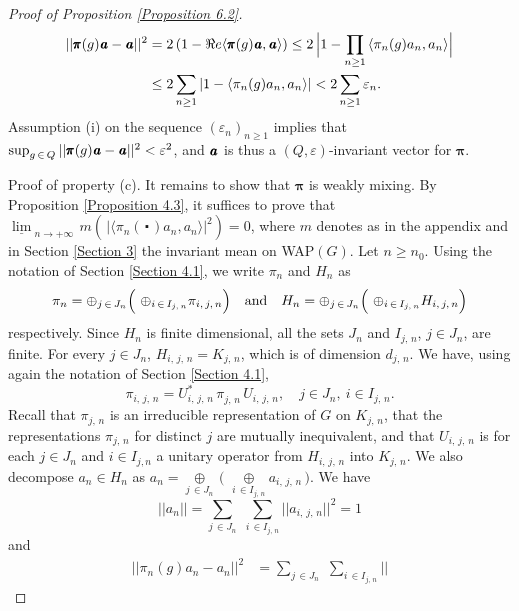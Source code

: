 \documentclass[11pt,english,a4paper]{smfart}
\numberwithin{equation}{section}
\theoremstyle{definition}
\begin{document}
\begin{proof}[Proof of Proposition \ref{Proposition 6.2}]
\begin{align*}
 ||\pmb{\pi } (g){\mkern 1.5 mu\pmb{a}}-{\mkern 1.5 mu\pmb{a}}||^{2}&=2\,(1-\Re e{\ensuremath{{\langle {\pmb{\pi} 
(g){\mkern 1.5 mu\pmb{a}}},{\mkern 1.5 mu\pmb{a}}\rangle}}})\le 
2\,
 \Bigl|1-\prod_{n\ge 1}{\ensuremath{{\langle {\pi _{n}(g){a_{n}}},{a_{n}}\rangle}}}\Bigr|\\
 &\le 2\sum_{n\ge 1}|1-{\ensuremath{{\langle {\pi _{n}(g){a_{n}}},{a_{n}}\rangle}}}|<2\sum_{n\ge 1}{\varepsilon _{n}} .
\end{align*}
Assumption (i) on the sequence $({\varepsilon _{n}})_{n\ge 1}$ implies that 
$\sup_{g\,\in\,{Q}} ||\pmb{\pi } (g){\mkern 1.5 mu\pmb{a}}-{\mkern 1.5 mu\pmb{a}}||^{2}<\varepsilon ^{2}$,
and ${\mkern 1.5 mu\pmb{a}}$ is thus a $({Q},\varepsilon )$-invariant vector for $\pmb{\pi }$.
\par\smallskip 
\noindent\textsf{Proof of property} (c).
 It remains to show that $\pmb{\pi }$ is weakly mixing. By Proposition 
\ref{Proposition 4.3}, it suffices to prove that 
$\underline{\lim}_{\,\,n\to+\infty\, }m(\,|{\ensuremath{{\langle {\pi 
_{n}(\,\centerdot\,){a_{n}}},{a_{n}}\rangle}}}|^{2})=0$, where $m$ denotes as in the appendix and in Section
\ref{Section 3} the invariant mean on 
\mbox{WAP$(G)$}. Let $n \ge n_{0}$. Using the notation of Section \ref{Section 4.1}, we 
write $\pi _{n}$ and $H_{n}$ as
\[
\pi _{n}={\mathop{\oplus}}_{j\,\in\,J_{n}}\Bigl(\ {\mathop{\oplus}}_{i\,\in\, I_{j,\,n}}\pi 
_{i,\,{j,\,n} } \Bigr)\quad\textrm{and}\quad 
H _{n}={\mathop{\oplus}}_{j\,\in\,J_{n}}\Bigl(\ {\mathop{\oplus}}_{i\,\in\, I_{j,\,n}}H
_{i,\,{j,\,n} } \Bigr)
\]
respectively. Since $H_{n}$ is finite dimensional, all the sets $J_{n}$ 
and $I_{j,\,n}$, 
$j\in J_{n}$, are finite. For every $j\in J_{n}$, $H_{i,\,j,\,n}=K_{j,\,n}$, 
which is of dimension $d_{j,\,n}$. We have, using again the notation of 
Section \ref{Section 4.1},
\[
\pi _{i,\,j,\,n}=U^{*}_{i,\,j,\,n}\,\pi_{j,\,n}^{}\,U_{i,\,j,\,n}^{},\quad j\in J_{n},\ 
i\in  I_{j,\,n}.
\]
Recall that $\pi _{j,\,n}$ is an irreducible representation of $G$ on $K_{j,\,n}$, that the representations $\pi _{j,\,n}$ for distinct $j$ are mutually inequivalent, and that
$U_{i,\,j,\,n}$ is for each $j\in J_{n}$ and $i\in I_{j,n}$ a unitary operator from $H_{i,\,j,\,n}$ into $K_{j,\,n}$. We  also decompose ${a_{n}}\in 
H_{n}$ as ${a_{n}}={\mathop{\oplus}}\limits_{j\,\in J_{n}}\,\bigl(\,\,{\mathop{\oplus}}\limits_{i\,\in 
I_{j,\,n}}a_{i,\,j,\,n}\, \bigr)$. We have
\[
||a_{n}||= \sum_{j\,\in J_{n}}\,\,\sum_{i\,\in I_{j,\,n}}||a_{i,\,j,\,n}||^{2}=1
\]
and
\begin{align}
 ||\pi _{n}(g){a_{n}}-{a_{n}}||^{2}&=\sum_{j\,\in J_{n}}\,\,\sum_{i\,\in I_{j,\,n}}||

\end{align}
\end{proof}
\end{document}
